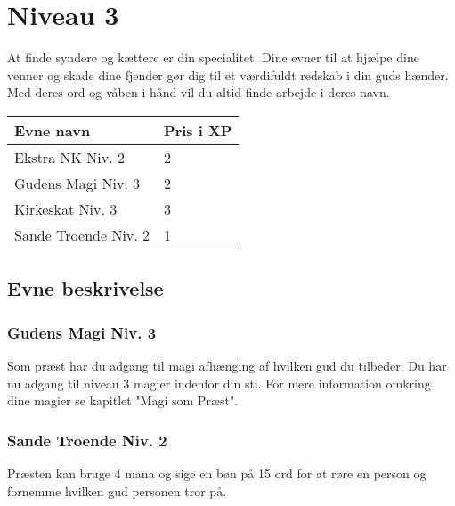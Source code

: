 \chapter{Niveau 3}
At finde syndere og kættere er din specialitet. Dine evner til at hjælpe dine venner og skade dine fjender gør dig til et værdifuldt redskab i din guds hænder. Med deres ord og våben i hånd vil du altid finde arbejde i deres navn.

\begin{table}[H]
    \centering
    \begin{tabular}{|p{}|p{}|}
    \rowcolor{cerulean!80}\hline
        Evne navn & Pris i XP \\\hline
            Ekstra NK Niv. 2 & 2 \\\hline
            Gudens Magi Niv. 3 & 2\\\hline
            Kirkeskat Niv. 3 & 3\\\hline
            Sande Troende Niv. 2& 1 \\\hline
    \end{tabular}
\end{table}

\section{Evne beskrivelse}



\subsection{Gudens Magi Niv. 3}
Som præst har du adgang til magi afhænging af hvilken gud du tilbeder. Du har nu adgang til niveau 3 magier indenfor din sti. For mere information omkring dine magier se kapitlet "Magi som Præst".



\subsection{Sande Troende Niv. 2}
Præsten kan bruge 4 mana og sige en bøn på 15 ord for at røre en person og fornemme hvilken gud personen tror på. 